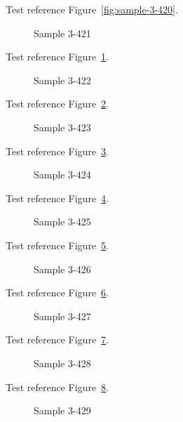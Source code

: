 Test reference Figure~\ref{fig:sample-3-420}.

\begin{figure}[tbhp]
\caption{Sample 3-421}
\label{fig:sample-3-421}
\end{figure}

Test reference Figure~\ref{fig:sample-3-421}.

\begin{figure}[tbhp]
\caption{Sample 3-422}
\label{fig:sample-3-422}
\end{figure}

Test reference Figure~\ref{fig:sample-3-422}.

\begin{figure}[tbhp]
\caption{Sample 3-423}
\label{fig:sample-3-423}
\end{figure}

Test reference Figure~\ref{fig:sample-3-423}.

\begin{figure}[tbhp]
\caption{Sample 3-424}
\label{fig:sample-3-424}
\end{figure}

Test reference Figure~\ref{fig:sample-3-424}.

\begin{figure}[tbhp]
\caption{Sample 3-425}
\label{fig:sample-3-425}
\end{figure}

Test reference Figure~\ref{fig:sample-3-425}.

\begin{figure}[tbhp]
\caption{Sample 3-426}
\label{fig:sample-3-426}
\end{figure}

Test reference Figure~\ref{fig:sample-3-426}.

\begin{figure}[tbhp]
\caption{Sample 3-427}
\label{fig:sample-3-427}
\end{figure}

Test reference Figure~\ref{fig:sample-3-427}.

\begin{figure}[tbhp]
\caption{Sample 3-428}
\label{fig:sample-3-428}
\end{figure}

Test reference Figure~\ref{fig:sample-3-428}.

\begin{figure}[tbhp]
\caption{Sample 3-429}
\label{fig:sample-3-429}
\end{figure}

